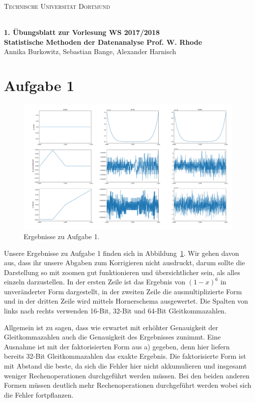 \documentclass[a4paper, 11pt]{article}
\begin{document}
\noindent
\centerline{\small{\textsc{Technische Universität Dortmund}}} \\
\large{\textbf{1. Übungsblatt zur Vorlesung \hfill WS 2017/2018 \\
Statistische Methoden der Datenanalyse \hfill Prof. W. Rhode}} \\
Annika Burkowitz, Sebastian Bange, Alexander Harnisch \\
\noindent\makebox[\linewidth]{\rule{\textwidth}{0.4pt}}

\section*{Aufgabe 1}
\begin{figure}
    \centering
    \includegraphics[width=\textwidth]{../A01/A1.pdf}
    \caption{Ergebnisse zu Aufgabe 1.}
    \label{fig:a1}
\end{figure}
Unsere Ergebnisse zu Aufgabe 1 finden sich in Abbildung~\ref{fig:a1}. Wir gehen davon aus, dass ihr unsere Abgaben zum Korrigieren nicht ausdruckt, darum sollte die Darstellung so mit zoomen gut funktionieren und übersichtlicher sein, als alles einzeln darzustellen. In der ersten Zeile ist das Ergebnis von $(1-x)^6$ in unveränderter Form dargestellt, in der zweiten Zeile die ausmultiplizierte Form und in der dritten Zeile wird mittels Hornerschema ausgewertet. Die Spalten von links nach rechts verwenden 16-Bit, 32-Bit und 64-Bit Gleitkommazahlen. 

Allgemein ist zu sagen, dass wie erwartet mit erhöhter Genauigkeit der Gleitkommazahlen auch die Genauigkeit des Ergebnisses zunimmt. Eine Ausnahme ist mit der faktorisierten Form aus a) gegeben, denn hier liefern bereits 32-Bit Gleitkommazahlen das exakte Ergebnis. Die faktorisierte Form ist mit Abstand die beste, da sich die Fehler hier nicht akkumulieren und insgesamt weniger Rechenoperationen durchgeführt werden müssen. Bei den beiden anderen Formen müssen deutlich mehr Rechenoperationen durchgeführt werden wobei sich die Fehler fortpflanzen.
\end{document}
